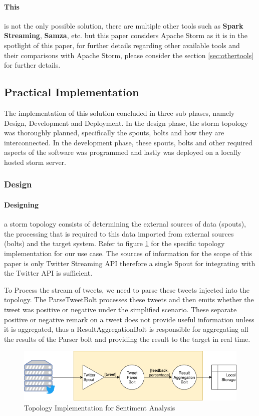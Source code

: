 \documentclass[runningheads,a4paper]{llncs}[2015/06/24]
\begin{document}
\paragraph{This} is not the only possible solution, there are multiple other tools such as \textbf{Spark Streaming}, \textbf{Samza}, etc. but this paper considers Apache Storm as it is in the spotlight of this paper, for further details regarding other available tools and their comparisons with Apache Storm, please consider the section \ref{sec:othertools} for further details.

\subsection{Practical Implementation}
The implementation of this solution concluded in three sub phases, namely Design, Development and Deployment. In the design phase, the storm topology was thoroughly planned, specifically the spouts, bolts and how they are interconnected. In the development phase, these spouts, bolts and other required aspects of the software was programmed and lastly was deployed on a locally hosted storm server.

\subsubsection{Design}
\paragraph{Designing} a storm topology consists of determining the external sources of data (spouts), the processing that is required to this data imported from external sources (bolts) and the target system. Refer to figure \ref{fig:topoimpl} for the specific topology implementation for our use case. The sources of information for the scope of this paper is only Twitter Streaming API therefore a single Spout for integrating with the Twitter API is sufficient.

To Process the stream of tweets, we need to parse these tweets injected into the topology. The ParseTweetBolt processes these tweets and then emits whether the tweet was positive or negative under the simplified scenario. These separate positive or negative remark on a tweet does not provide useful information unless it is aggregated, thus a ResultAggregationBolt is responsible for aggregating all the results of the Parser bolt and providing the result to the target in real time.

\begin{figure}
  \begin{center}
    \includegraphics[width=.7\textwidth]{topoimpl.png}
    \caption{Topology Implementation for Sentiment Analysis}
    \label{fig:topoimpl}
   \end{center}
\end{figure}
\end{document}
